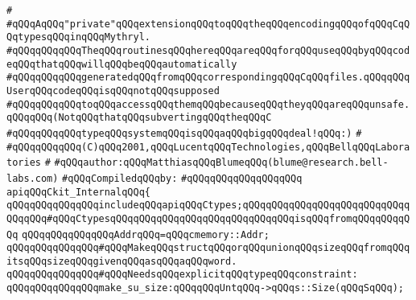 \label{src/lib/c-glue-lib/internals/ckit-internal.api}
\verb|#|\newline
\verb|#qQQqAqQQq"private"qQQqextensionqQQqtoqQQqtheqQQqencodingqQQqofqQQqCqQQqtypesqQQqinqQQqMythryl.|\newline
\verb|#qQQqqQQqqQQqTheqQQqroutinesqQQqhereqQQqareqQQqforqQQquseqQQqbyqQQqcodeqQQqthatqQQqwillqQQqbeqQQqautomatically|\newline
\verb|#qQQqqQQqqQQqgeneratedqQQqfromqQQqcorrespondingqQQqCqQQqfiles.qQQqqQQqUserqQQqcodeqQQqisqQQqnotqQQqsupposed|\newline
\verb|#qQQqqQQqqQQqtoqQQqaccessqQQqthemqQQqbecauseqQQqtheyqQQqareqQQqunsafe.qQQqqQQq(NotqQQqthatqQQqsubvertingqQQqtheqQQqC|\newline
\verb|#qQQqqQQqqQQqtypeqQQqsystemqQQqisqQQqaqQQqbigqQQqdeal!qQQq:)|\newline
\verb|#|\newline
\verb|#qQQqqQQqqQQq(C)qQQq2001,qQQqLucentqQQqTechnologies,qQQqBellqQQqLaboratories|\newline
\verb|#|\newline
\verb|#qQQqauthor:qQQqMatthiasqQQqBlumeqQQq(blume@research.bell-labs.com)|\newline
\newline
\verb|#qQQqCompiledqQQqby:|\newline
\verb|#qQQqqQQqqQQqqQQqqQQq|\newline
\newline
\verb|apiqQQqCkit_InternalqQQq{|\newline
\newline
\verb|qQQqqQQqqQQqqQQqincludeqQQqapiqQQqCtypes;qQQqqQQqqQQqqQQqqQQqqQQqqQQqqQQqqQQq#qQQqCtypesqQQqqQQqqQQqqQQqqQQqqQQqqQQqqQQqisqQQqfromqQQqqQQqqQQq|\newline
\newline
\verb|qQQqqQQqqQQqqQQqAddrqQQq=qQQqcmemory::Addr;|\newline
\newline
\verb|qQQqqQQqqQQqqQQq#qQQqMakeqQQqstructqQQqorqQQqunionqQQqsizeqQQqfromqQQqitsqQQqsizeqQQqgivenqQQqasqQQqaqQQqword.|\newline
\verb|qQQqqQQqqQQqqQQq#qQQqNeedsqQQqexplicitqQQqtypeqQQqconstraint:|\newline
\verb|qQQqqQQqqQQqqQQqmake_su_size:qQQqqQQqUntqQQq->qQQqs::Size(qQQqSqQQq);|\newline
